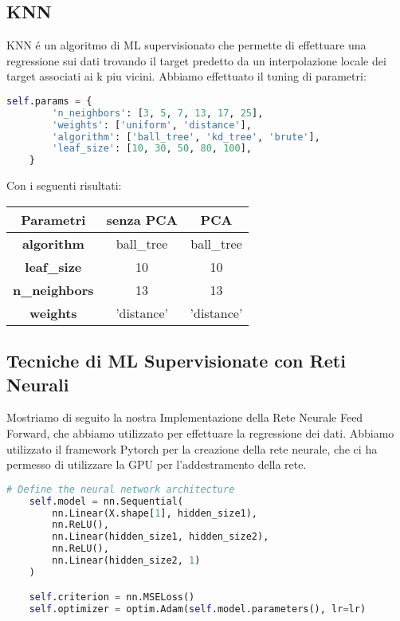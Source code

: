 \documentclass[../../Report.tex]{subfiles}
\begin{document}
\subsection{KNN}
KNN é un algoritmo di ML supervisionato che permette di effettuare una regressione sui dati trovando il target predetto da un interpolazione locale dei target associati ai k piu vicini.
Abbiamo effettuato il tuning di parametri:
\begin{lstlisting}[language=Python]
    self.params = {
        'n_neighbors': [3, 5, 7, 13, 17, 25],
        'weights': ['uniform', 'distance'],
        'algorithm': ['ball_tree', 'kd_tree', 'brute'],
        'leaf_size': [10, 30, 50, 80, 100],
    }
\end{lstlisting}
Con i seguenti risultati:
\begin{table}[h]
    \centering
    \begin{tabular}{|c|c|c|}
    \hline
\textbf{Parametri} & \textbf{senza PCA} & \textbf{PCA} \\ \hline
\textbf{algorithm}& ball\_tree & ball\_tree\\
\textbf{leaf\_size}& 10 &  10 \\
\textbf{n\_neighbors}& 13 & 13\\
\textbf{weights}& 'distance' &  'distance'\\
\hline
\end{tabular}
\end{table}

\subsection{Tecniche di ML Supervisionate con Reti Neurali}
Mostriamo di seguito la nostra Implementazione della Rete Neurale Feed Forward, che abbiamo utilizzato per effettuare la regressione dei dati.
Abbiamo utilizzato il framework Pytorch per la creazione della rete neurale, che ci ha permesso di utilizzare la GPU per l'addestramento della rete.

\begin{lstlisting}[language=python]
    # Define the neural network architecture
    self.model = nn.Sequential(
        nn.Linear(X.shape[1], hidden_size1),
        nn.ReLU(),
        nn.Linear(hidden_size1, hidden_size2),
        nn.ReLU(),
        nn.Linear(hidden_size2, 1)
    )

    self.criterion = nn.MSELoss()
    self.optimizer = optim.Adam(self.model.parameters(), lr=lr)

\end{lstlisting}
\end{document}
